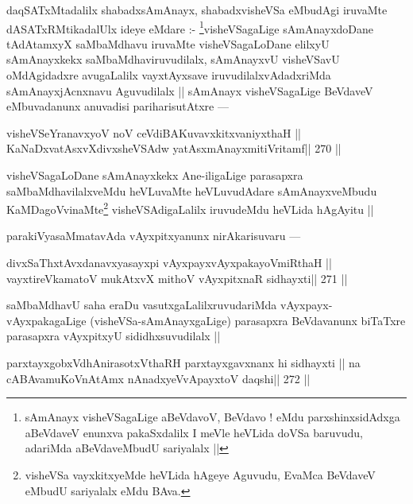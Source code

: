 \begin{artha}
daqSATxMtadalilx shabadxsAmAnayx, shabadxvisheVSa eMbudAgi iruvaMte dASATxRMtikadalUlx ideye eMdare :- \footnote[1]{sAmAnayx visheVSagaLige aBeVdavoV, BeVdavo ! eMdu parxshinxsidAdxga aBeVdaveV enunxva pakaSxdalilx I meVle heVLida doVSa baruvudu, adariMda aBeVdaveMbudU sariyalalx ||}visheVSagaLige sAmAnayxdoDane tAdAtamxyX saMbaMdhavu iruvaMte visheVSagaLoDane elilxyU sAmAnayxkekx saMbaMdhaviruvudilalx, sAmAnayxvU visheVSavU oMdAgidadxre avugaLalilx vayxtAyxsave iruvudilalxvAdadxriMda sAmAnayxjAcnxnavu Aguvudilalx || sAmAnayx visheVSagaLige BeVdaveV eMbuvadanunx anuvadisi pariharisutAtxre ---
\end{artha}

\begin{shl}
visheVSeYranavxyoV noV ceVdiBAKuvavxkitxvaniyxthaH ||
KaNaDxvatAsxvXdivxsheVSAdw yatAsxmAnayxmitiVritamf\hfill || 270 ||
\end{shl}

\begin{artha}
visheVSagaLoDane sAmAnayxkekx Ane-iligaLige parasapxra saMbaMdhavilalxveMdu heVLuvaMte heVLuvudAdare sAmAnayxveMbudu KaMDagoVvinaMte\footnote[2]{visheVSa vayxkitxyeMde heVLida hAgeye Aguvudu, EvaMca BeVdaveV eMbudU sariyalalx eMdu BAva.} visheVSAdigaLalilx iruvudeMdu heVLida hAgAyitu ||
\end{artha}

\begin{artha}
parakiVyasaMmatavAda vAyxpitxyanunx nirAkarisuvaru ---
\end{artha}

\begin{shl}
divxSaThxtAvxdanavxyasayxpi vAyxpayxvAyxpakayoVmiRthaH ||
vayxtireVkamatoV mukAtxvX mithoV vAyxpitxnaR sidhayxti\hfill || 271 ||
\end{shl}

\begin{artha}
saMbaMdhavU saha eraDu vasutxgaLalilxruvudariMda vAyxpayx-vAyxpakagaLige (visheVSa-sAmAnayxgaLige) parasapxra BeVdavanunx biTaTxre parasapxra vAyxpitxyU sididhxsuvudilalx ||
\end{artha}

\begin{shl}
parxtayxgobxVdhAnirasotxV\s thaRH parxtayxgavxnanx hi sidhayxti ||
na cABAvamuKoV\s nAtAmx nAnadxyeVvApayxtoV daqshi\hfill || 272 ||
\end{shl}


